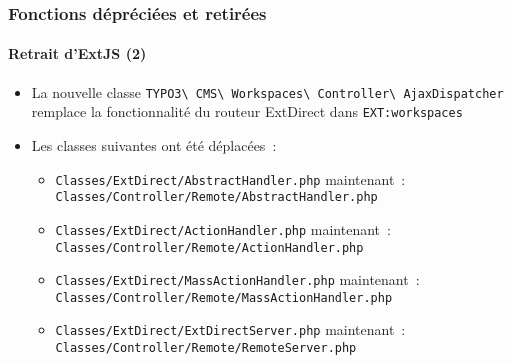 \begin{frame}[fragile]
	\frametitle{Fonctions dépréciées et retirées}
	\framesubtitle{Retrait d'ExtJS (2)}

	\begin{itemize}
		\item La nouvelle classe
			\texttt{TYPO3\textbackslash
				CMS\textbackslash
				Workspaces\textbackslash
				Controller\textbackslash
				AjaxDispatcher}
			remplace la fonctionnalité du routeur ExtDirect dans \texttt{EXT:workspaces}

		\item Les classes suivantes ont été déplacées~:

		\begin{itemize}
			\item \smaller\texttt{Classes/ExtDirect/AbstractHandler.php}\newline
				maintenant~: \texttt{Classes/Controller/Remote/AbstractHandler.php}\normalsize

			\item \smaller\texttt{Classes/ExtDirect/ActionHandler.php}\newline
				maintenant~: \texttt{Classes/Controller/Remote/ActionHandler.php}\normalsize

			\item \smaller\texttt{Classes/ExtDirect/MassActionHandler.php}\newline
				maintenant~: \texttt{Classes/Controller/Remote/MassActionHandler.php}\normalsize

			\item \smaller\texttt{Classes/ExtDirect/ExtDirectServer.php}\newline
				maintenant~: \texttt{Classes/Controller/Remote/RemoteServer.php}\normalsize

		\end{itemize}

	\end{itemize}

\end{frame}
